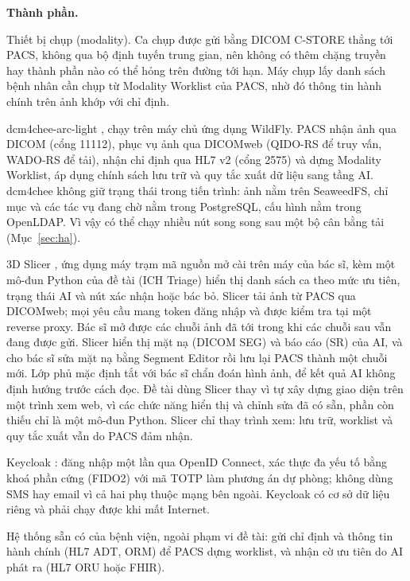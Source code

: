 \textbf{Thành phần.}
\begin{description}[leftmargin=3.4cm,style=nextline]
\item[Máy chụp CT] Thiết bị chụp (modality). Ca chụp được gửi bằng DICOM C-STORE
      thẳng tới PACS, không qua bộ định tuyến trung gian, nên không có thêm chặng truyền
      hay thành phần nào có thể hỏng trên đường tới hạn. Máy chụp lấy danh sách bệnh
      nhân cần chụp từ Modality Worklist của PACS, nhờ đó thông tin hành chính trên ảnh
      khớp với chỉ định.
\item[PACS] dcm4chee-arc-light \cite{dcm4chee}, chạy trên máy chủ ứng dụng WildFly.
      PACS nhận ảnh qua DICOM (cổng 11112), phục vụ ảnh qua DICOMweb (QIDO-RS để truy
      vấn, WADO-RS để tải), nhận chỉ định qua HL7 v2 (cổng 2575) và dựng Modality
      Worklist, áp dụng chính sách lưu trữ và quy tắc xuất dữ liệu sang tầng AI. dcm4chee
      không giữ trạng thái trong tiến trình: ảnh nằm trên SeaweedFS, chỉ mục và các tác
      vụ đang chờ nằm trong PostgreSQL, cấu hình nằm trong OpenLDAP. Vì vậy có thể chạy
      nhiều nút song song sau một bộ cân bằng tải (Mục~\ref{sec:ha}).
\item[Trình xem] 3D Slicer \cite{fedorov2012slicer}, ứng dụng máy trạm mã nguồn mở
      cài trên máy của bác sĩ, kèm một mô-đun Python của đề tài (ICH Triage) hiển thị
      danh sách ca theo mức ưu tiên, trạng thái AI và nút xác nhận hoặc bác bỏ. Slicer tải
      ảnh từ PACS qua DICOMweb; mọi yêu cầu mang token đăng nhập và được kiểm tra tại một
      reverse proxy. Bác sĩ mở được các chuỗi ảnh đã tới trong khi các chuỗi sau vẫn đang
      được gửi. Slicer hiển thị mặt nạ (DICOM SEG) và báo cáo (SR) của AI, và cho bác sĩ
      sửa mặt nạ bằng Segment Editor rồi lưu lại PACS thành một chuỗi mới. Lớp phủ mặc
      định tắt với bác sĩ chẩn đoán hình ảnh, để kết quả AI không định hướng trước cách
      đọc. Đề tài dùng Slicer thay vì tự xây dựng giao diện trên một trình xem web, vì các
      chức năng hiển thị và chỉnh sửa đã có sẵn, phần còn thiếu chỉ là một mô-đun Python.
      Slicer chỉ thay trình xem: lưu trữ, worklist và quy tắc xuất vẫn do PACS đảm nhận.
\item[Đăng nhập] Keycloak \cite{keycloak}: đăng nhập một lần qua OpenID Connect, xác
      thực đa yếu tố bằng khoá phần cứng (FIDO2) với mã TOTP làm phương án dự phòng; không
      dùng SMS hay email vì cả hai phụ thuộc mạng bên ngoài. Keycloak có cơ sở dữ liệu
      riêng và phải chạy được khi mất Internet.
\item[HIS/RIS] Hệ thống sẵn có của bệnh viện, ngoài phạm vi đề tài: gửi chỉ định và
      thông tin hành chính (HL7 ADT, ORM) để PACS dựng worklist, và nhận cờ ưu tiên do
      AI phát ra (HL7 ORU hoặc FHIR).
\end{description}

